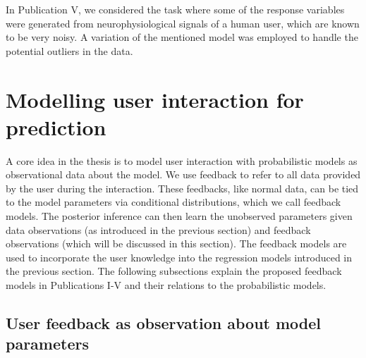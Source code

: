 \documentclass[dissertation,math,vertlayout,pdfa,colorlinks]{aaltoseries}
\begin{document}
\noindent In Publication V, we considered the task where some of the response variables were generated from neurophysiological  signals of a human user, which are known to be very noisy. A variation of the mentioned model was employed to handle the potential outliers in the data. 

\section{Modelling user interaction for prediction}\label{prob_model_user}

A core idea in the thesis is to model user interaction with probabilistic models as observational data about the model. We use feedback to refer to all data provided by the user during the interaction. 
These feedbacks, like normal data, can be tied to the model parameters via conditional distributions, which we call feedback models. The posterior inference can then learn the unobserved parameters given data observations (as introduced in the previous section) and feedback observations (which will be discussed in this section). The feedback models are used to incorporate the user knowledge into the regression models introduced in the previous section. The following subsections explain the proposed feedback models in Publications I-V and their relations to the probabilistic models.


\subsection{User feedback as observation about model parameters}\label{KE_models}
\end{document}
